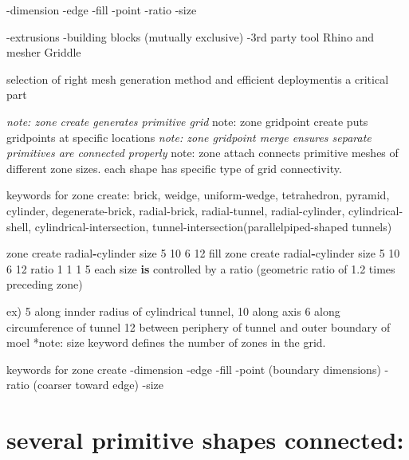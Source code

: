 \documentclass[a4paper, nobind]{templates/ociamthesis}
\newenvironment{Shaded}{\begin{snugshade}}{\end{snugshade}}
\newcommand{\DecValTok}[1]{\textcolor[rgb]{0.00,0.00,0.81}{#1}}
\newcommand{\FloatTok}[1]{\textcolor[rgb]{0.00,0.00,0.81}{#1}}
\newcommand{\KeywordTok}[1]{\textcolor[rgb]{0.13,0.29,0.53}{\textbf{#1}}}
\newcommand{\NormalTok}[1]{#1}
\newcommand{\OperatorTok}[1]{\textcolor[rgb]{0.81,0.36,0.00}{\textbf{#1}}}
\renewenvironment{Shaded}
{
  \vspace{10pt}%
  \begin{snugshade}%
}{%
  \end{snugshade}%
  \vspace{8pt}%
}
\begin{document}
-dimension
-edge
-fill
-point
-ratio
-size

-extrusions
-building blocks
(mutually exclusive)
-3rd party tool Rhino and mesher Griddle

selection of right mesh generation method
and efficient deploymentis a critical part

\emph{note: zone create generates primitive grid
}note: zone gridpoint create puts gridpoints at specific locations
\emph{note: zone gridpoint merge ensures separate primitives are connected properly
}note: zone attach connects primitive meshes of different zone sizes.
each shape has specific type of grid connectivity.

keywords for zone create:
brick, weidge, uniform-wedge, tetrahedron, pyramid, cylinder, degenerate-brick, radial-brick, radial-tunnel, radial-cylinder, cylindrical-shell, cylindrical-intersection, tunnel-intersection(parallelpiped-shaped tunnels)

\begin{Shaded}
\begin{Highlighting}[]
\NormalTok{zone create radial}\OperatorTok{{-}}\NormalTok{cylinder size }\DecValTok{5} \DecValTok{10} \DecValTok{6} \DecValTok{12}\NormalTok{ fill}
\NormalTok{zone create radial}\OperatorTok{{-}}\NormalTok{cylinder size }\DecValTok{5} \DecValTok{10} \DecValTok{6} \DecValTok{12}\NormalTok{ ratio }\DecValTok{1} \DecValTok{1} \DecValTok{1} \DecValTok{5}
\NormalTok{each size }\KeywordTok{is}\NormalTok{ controlled by a ratio (geometric ratio of }\FloatTok{1.2}\NormalTok{ times preceding zone)}
\end{Highlighting}
\end{Shaded}

ex) 5 along innder radius of cylindrical tunnel,
10 along axis
6 along circumference of tunnel
12 between periphery of tunnel and outer boundary of moel
*note: size keyword defines the number of zones in the grid.

keywords for zone create
-dimension
-edge
-fill
-point (boundary dimensions)
-ratio (coarser toward edge)
-size

\hypertarget{several-primitive-shapes-connected}{%
\section{several primitive shapes connected:}\label{several-primitive-shapes-connected}}
\end{document}

